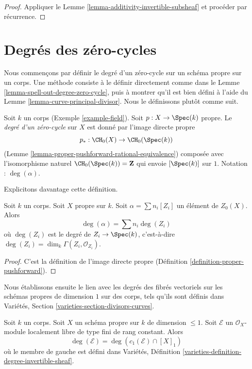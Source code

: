 \begin{proof}
Appliquer le Lemme \ref{lemma-additivity-invertible-subsheaf} et procéder par récurrence.
\end{proof}




\section{Degrés des zéro-cycles}
\label{section-degree-zero-cycles}

\noindent
Nous commençons par définir le degré d'un zéro-cycle sur un schéma propre sur un corps.
Une méthode consiste à le définir directement comme dans le
Lemme \ref{lemma-spell-out-degree-zero-cycle}, puis à montrer
qu'il est bien défini à l'aide du
Lemme \ref{lemma-curve-principal-divisor}.
Nous le définissons plutôt comme suit.

\begin{definition}
\label{definition-degree-zero-cycle}
Soit $k$ un corps (Exemple \ref{example-field}). Soit $p : X \to \Spec(k)$
propre. Le {\it degré d'un zéro-cycle} sur $X$ est donné par l'image
directe propre
$$
p_* : \CH_0(X) \to \CH_0(\Spec(k))
$$
(Lemme \ref{lemma-proper-pushforward-rational-equivalence})
composée avec l'isomorphisme naturel $\CH_0(\Spec(k)) = \mathbf{Z}$
qui envoie $[\Spec(k)]$ sur $1$. Notation : $\deg(\alpha)$.
\end{definition}

\noindent
Explicitons davantage cette définition.

\begin{lemma}
\label{lemma-spell-out-degree-zero-cycle}
Soit $k$ un corps. Soit $X$ propre sur $k$. Soit $\alpha = \sum n_i[Z_i]$
un élément de $Z_0(X)$. Alors
$$
\deg(\alpha) = \sum n_i\deg(Z_i)
$$
où $\deg(Z_i)$ est le degré de $Z_i \to \Spec(k)$, c'est-à-dire
$\deg(Z_i) = \dim_k \Gamma(Z_i, \mathcal{O}_{Z_i})$.
\end{lemma}

\begin{proof}
C'est la définition de l'image directe propre
(Définition \ref{definition-proper-pushforward}).
\end{proof}

\noindent
Nous établissons ensuite le lien avec les degrés des fibrés vectoriels
sur les schémas propres de dimension $1$ sur des corps, tels qu'ils sont définis dans
Variétés, Section \ref{varieties-section-divisors-curves}.

\begin{lemma}
\label{lemma-degree-vector-bundle}
Soit $k$ un corps. Soit $X$ un schéma propre sur $k$ de dimension $\leq 1$.
Soit $\mathcal{E}$ un $\mathcal{O}_X$-module localement libre de type fini de
rang constant. Alors
$$
\deg(\mathcal{E}) = \deg(c_1(\mathcal{E}) \cap [X]_1)
$$
où le membre de gauche est défini dans
Variétés, Définition \ref{varieties-definition-degree-invertible-sheaf}.
\end{lemma}

